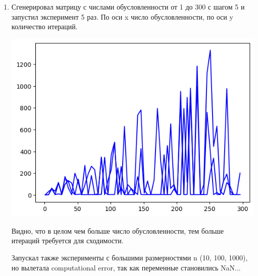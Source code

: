 \documentclass[12pt]{article}
\begin{document}
\begin{enumerate}

\item %

Сгенерировал матрицу с числами обусловленности от 1 до 300 с шагом 5 и запустил эксперимент 5 раз. По оси x число обусловленности, по оси y количество итераций.

\includegraphics{exp2/condition_numbers.png}

Видно, что в целом чем больше число обусловленности, тем больше итераций требуется для сходимости. 

Запускал также эксперименты с большими размерностями n (10, 100, 1000), но вылетала computational error, так как переменные становились NaN...

\end{enumerate}
\end{document}
